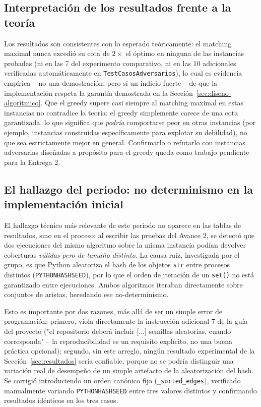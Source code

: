 \documentclass[11pt,a4paper]{article}
\begin{document}
\subsection{Interpretación de los resultados frente a la teoría}
Los resultados son consistentes con lo esperado teóricamente: el matching maximal nunca
excedió su cota de $2\times$ el óptimo en ninguna de las instancias probadas (ni en las 7 del
experimento comparativo, ni en las 10 adicionales verificadas automáticamente en
\texttt{TestCasosAdversarios}), lo cual es evidencia empírica -- no una demostración, pero sí
un indicio fuerte -- de que la implementación respeta la garantía demostrada en la
Sección~\ref{sec:diseno-algoritmico}. Que el greedy supere casi siempre al matching maximal
en estas instancias no contradice la teoría: el greedy simplemente carece de una cota
garantizada, lo que significa que \emph{podría} comportarse peor en otras instancias
(por ejemplo, instancias construidas específicamente para explotar su debilidad), no que
sea estrictamente mejor en general. Confirmarlo o refutarlo con instancias adversarias
diseñadas a propósito para el greedy queda como trabajo pendiente para la Entrega 2.

\subsection{El hallazgo del periodo: no determinismo en la implementación inicial}
El hallazgo técnico más relevante de este periodo no aparece en las tablas de resultados,
sino en el proceso: al escribir las pruebas del Avance 2, se detectó que dos ejecuciones
del mismo algoritmo sobre la misma instancia podían devolver coberturas \emph{válidas pero
de tamaño distinto}. La causa raíz, investigada por el grupo, es que Python aleatoriza el
hash de los objetos \texttt{str} entre procesos distintos (\texttt{PYTHONHASHSEED}), por lo
que el orden de iteración de un \texttt{set()} no está garantizado entre ejecuciones. Ambos
algoritmos iteraban directamente sobre conjuntos de aristas, heredando ese no-determinismo.

Esto es importante por dos razones, más allá de ser un simple error de programación: primero,
viola directamente la instrucción adicional 7 de la guía del proyecto ("el repositorio
deberá incluir [...] semillas aleatorias, cuando corresponda" -- la reproducibilidad es un
requisito explícito, no una buena práctica opcional); segundo, sin este arreglo, ningún
resultado experimental de la Sección~\ref{sec:resultados} sería confiable, porque no se
podría distinguir una variación real de desempeño de un simple artefacto de la
aleatorización del hash. Se corrigió introduciendo un orden canónico fijo
(\texttt{\_sorted\_edges}), verificado manualmente variando \texttt{PYTHONHASHSEED} entre
tres valores distintos y confirmando resultados idénticos en los tres casos.
\end{document}
